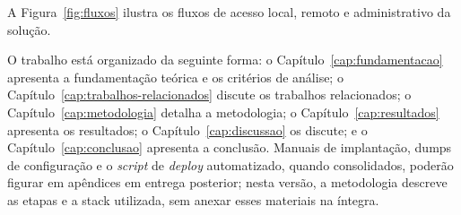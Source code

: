 \begin{figure}[H]
    \centering
    \fonteautoria
\end{figure}

A Figura~\ref{fig:fluxos} ilustra os fluxos de acesso local, remoto e administrativo da solução.

\begin{figure}[H]
    \centering
    \fonteautoria
\end{figure}

O trabalho está organizado da seguinte forma: o Capítulo~\ref{cap:fundamentacao} apresenta a fundamentação teórica e os critérios de análise; o Capítulo~\ref{cap:trabalhos-relacionados} discute os trabalhos relacionados; o Capítulo~\ref{cap:metodologia} detalha a metodologia; o Capítulo~\ref{cap:resultados} apresenta os resultados; o Capítulo~\ref{cap:discussao} os discute; e o Capítulo~\ref{cap:conclusao} apresenta a conclusão. Manuais de implantação, dumps de configuração e o \textit{script} de \textit{deploy} automatizado, quando consolidados, poderão figurar em apêndices em entrega posterior; nesta versão, a metodologia descreve as etapas e a stack utilizada, sem anexar esses materiais na íntegra.

